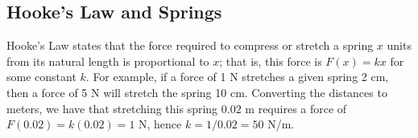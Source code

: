\subsection{Hooke's Law and Springs}

Hooke's Law states that the force required to compress or stretch a spring $x$ units from its natural length is proportional to $x$; that is, this force is $F(x) = kx$ for some constant $k$. For example, if a force of 1 N stretches a given spring 2 cm, then a force of 5 N will stretch the spring 10 cm. Converting the distances to meters, we have that stretching this spring 0.02 m requires a force of $F(0.02) = k(0.02) = 1$ N, hence $k = 1/0.02 = 50$ N/m. 

